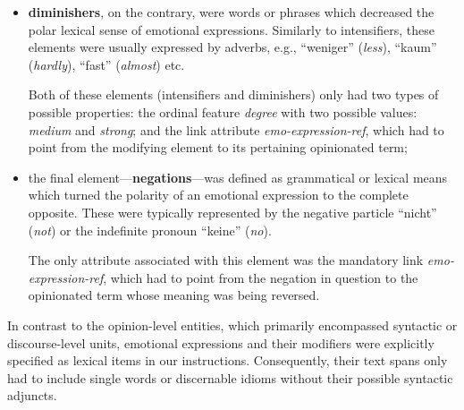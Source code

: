 \begin{itemize}
\item
  \textbf{diminishers}, on the contrary, were words or phrases which
  decreased the polar lexical sense of emotional expressions.
  Similarly to intensifiers, these elements were usually expressed by
  adverbs, e.g., ``weniger'' (\emph{less}), ``kaum'' (\emph{hardly}),
  ``fast'' (\emph{almost}) etc.

  Both of these elements (intensifiers and diminishers) only had two
  types of possible properties: the ordinal feature \emph{degree} with
  two possible values: \emph{medium} and \emph{strong}; and the link
  attribute \emph{emo-expression-ref}, which had to point from the
  modifying element to its pertaining opinionated term;

\item the final element---\textbf{negations}---was defined as
  grammatical or lexical means which turned the polarity of an
  emotional expression to the complete opposite.  These were typically
  represented by the negative particle ``nicht'' (\emph{not}) or the
  indefinite pronoun ``keine'' (\emph{no}).

  The only attribute associated with this element was the mandatory
  link \emph{emo-expression-ref}, which had to point from the negation
  in question to the opinionated term whose meaning was being
  reversed.
\end{itemize}

In contrast to the opinion-level entities, which primarily encompassed
syntactic or discourse-level units, emotional expressions and their
modifiers were explicitly specified as lexical items in our
instructions.  Consequently, their text spans only had to include
single words or discernable idioms without their possible syntactic
adjuncts.

